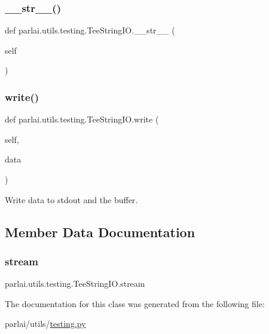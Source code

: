 \subsubsection{\texorpdfstring{\+\_\+\+\_\+str\+\_\+\+\_\+()}{\_\_str\_\_()}}
{\footnotesize\ttfamily def parlai.\+utils.\+testing.\+Tee\+String\+I\+O.\+\_\+\+\_\+str\+\_\+\+\_\+ (\begin{DoxyParamCaption}\item[{}]{self }\end{DoxyParamCaption})}

\mbox{\label{classparlai_1_1utils_1_1testing_1_1TeeStringIO_af8c256be884cbcb0081768bc04738015}} 
\subsubsection{\texorpdfstring{write()}{write()}}
{\footnotesize\ttfamily def parlai.\+utils.\+testing.\+Tee\+String\+I\+O.\+write (\begin{DoxyParamCaption}\item[{}]{self,  }\item[{}]{data }\end{DoxyParamCaption})}

\begin{DoxyVerb}Write data to stdout and the buffer.
\end{DoxyVerb}
 

\subsection{Member Data Documentation}
\mbox{\label{classparlai_1_1utils_1_1testing_1_1TeeStringIO_a4dc6e50f503b4679fe3b3fa0ebd729f1}} 
\subsubsection{\texorpdfstring{stream}{stream}}
{\footnotesize\ttfamily parlai.\+utils.\+testing.\+Tee\+String\+I\+O.\+stream}



The documentation for this class was generated from the following file\+:\begin{DoxyCompactItemize}
\item 
parlai/utils/\hyperlink{testing_8py}{testing.\+py}\end{DoxyCompactItemize}
